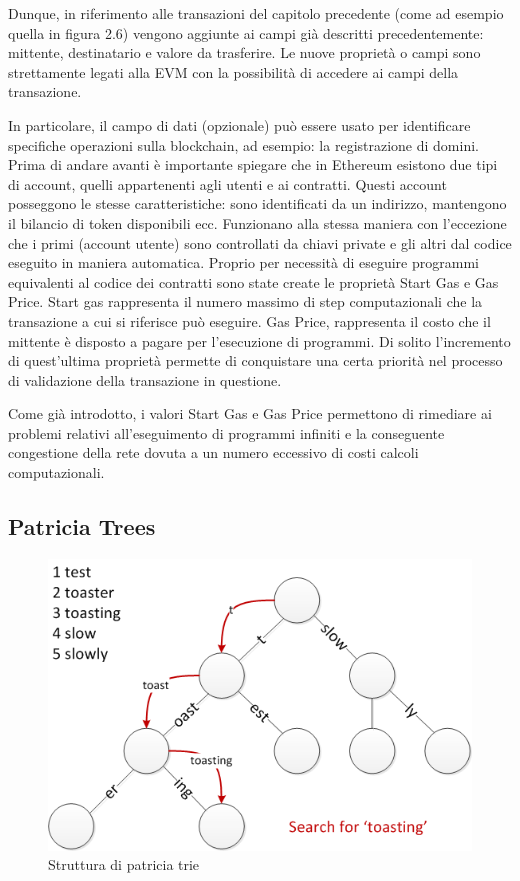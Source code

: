 Dunque, in riferimento alle transazioni del capitolo precedente (come ad esempio quella in figura 2.6) vengono aggiunte ai campi già descritti precedentemente: mittente, destinatario e valore da trasferire. Le nuove proprietà o campi sono strettamente legati alla EVM con la possibilità di accedere ai campi della transazione.

In particolare, il campo di dati (opzionale) può essere usato per identificare specifiche operazioni sulla blockchain, ad esempio: la registrazione di domini. Prima di andare avanti è importante spiegare che in Ethereum esistono due tipi di account, quelli appartenenti agli utenti e ai contratti. Questi account posseggono le stesse caratteristiche: sono identificati da un indirizzo, mantengono il bilancio di token disponibili ecc. Funzionano alla stessa maniera con l’eccezione che i primi (account utente) sono controllati da chiavi private e gli altri dal codice eseguito in maniera automatica. Proprio per necessità di eseguire programmi equivalenti al codice dei contratti sono state create le proprietà Start Gas e Gas Price. Start gas rappresenta il numero massimo di step computazionali che la transazione a cui si riferisce può eseguire. Gas Price, rappresenta il costo che il mittente è disposto a pagare per l’esecuzione di programmi. Di solito l’incremento di quest’ultima proprietà permette di conquistare una certa priorità nel processo di validazione della transazione in questione.

Come già introdotto, i valori Start Gas e Gas Price permettono di rimediare ai problemi relativi all'eseguimento di programmi infiniti e la conseguente congestione della rete dovuta a un numero eccessivo di costi calcoli computazionali.

\subsection{Patricia Trees}

\begin{figure}[H]
\centering
\includegraphics[width=1\textwidth]{immagini/patricia_trie.png}
\caption{Struttura di patricia trie}
\label{fig:mesh6}
\end{figure}

